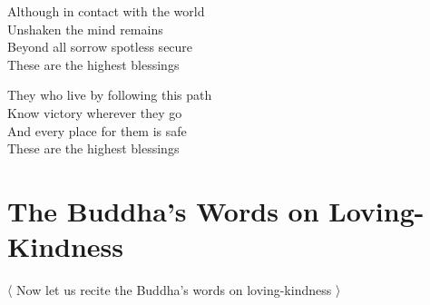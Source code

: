Although in contact with the world\\
Unshaken the mind remains\\
Beyond all sorrow spotless secure\\
These are the highest blessings

\bigskip

They who live by following this path\\
Know victory wherever they go\\
And every place for them is safe\\
These are the highest blessings

\suttaRef{[Snp 2.4]}


\section{The Buddha's Words on Loving-Kindness}
\label{words-on-loving-kindness}

\begin{leader}
  〈 Now let us recite the Buddha's words on loving-kindness 〉
\end{leader}

